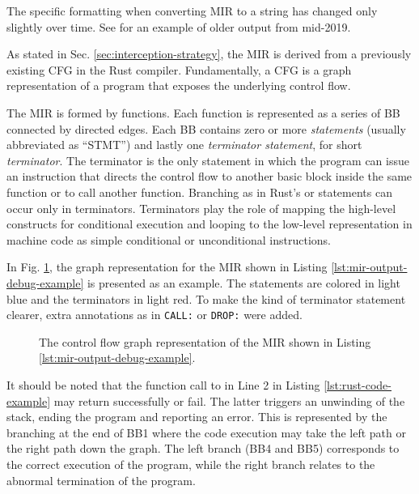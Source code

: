 The specific formatting when converting \acrshort{MIR} to a string has changed only slightly over time.
See \cite[Section 3.3]{meyer2020} for an example of older output from mid-2019.

As stated in Sec. \ref{sec:interception-strategy}, the \acrshort{MIR} is derived
from a previously existing \acrfull{CFG} in the Rust compiler.
Fundamentally, a \acrshort{CFG} is a graph representation of a program
that exposes the underlying control flow.

The MIR is formed by functions.
Each function is represented as a series of \acrfull{BB} connected by directed edges.
Each \acrshort{BB} contains zero or more \emph{statements} (usually abbreviated as ``STMT'')
and lastly one \emph{terminator statement}, for short \emph{terminator}.
The terminator is the only statement in which the program can issue an instruction
that directs the control flow to another basic block inside the same function
or to call another function.
Branching as in Rust's  or  statements can occur only in terminators.
Terminators play the role of mapping the high-level constructs
for conditional execution and looping to the low-level representation in machine code
as simple conditional or unconditional  instructions.

In Fig. \ref{fig:mir-cfg-example}, the graph representation
for the MIR shown in Listing \ref{lst:mir-output-debug-example} is presented as an example.
The statements are colored in light blue and the terminators in light red.
To make the kind of terminator statement clearer,
extra annotations as in \texttt{CALL:} or \texttt{DROP:} were added.

\begin{figure}[!htb]
    \centering
    
    \caption{The control flow graph representation of the MIR shown in Listing \ref{lst:mir-output-debug-example}.}
    \label{fig:mir-cfg-example}
\end{figure}

It should be noted that the function call to 
in Line 2 in Listing \ref{lst:rust-code-example} may return successfully or fail.
The latter triggers an unwinding of the stack, ending the program and reporting an error.
This is represented by the branching at the end of BB1 where the code execution
may take the left path or the right path down the graph.
The left branch (BB4 and BB5) corresponds to the correct execution of the program,
while the right branch relates to the abnormal termination of the program.

